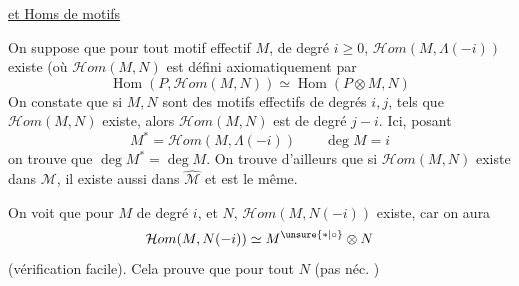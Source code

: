 \uline{ et Homs de motifs}

On suppose que pour tout motif effectif $M$, de degré $i\geq0$, $\mathcal Hom(M,\Lambda(-i))$ existe (où $\mathcal Hom(M,N)$ est défini axiomatiquement par
\[
\operatorname{Hom}(P,\mathcal Hom(M,N))\simeq\operatorname{Hom}(P\otimes M,N)
\]
On constate que si $M,N$ sont des motifs effectifs de degrés $i,j$, tels que $\mathcal Hom(M,N)$ existe, alors $\mathcal Hom(M,N)$ est de degré $j-i$. Ici, posant
\[
M^{*}=\mathcal Hom(M,\Lambda(-i))\qquad\deg M=i
\]
on trouve que $\deg M^{*}=\deg M$. On trouve d'ailleurs que si $\mathcal Hom(M,N)$ existe dans $\mathcal M$, il existe aussi dans $\widehat{\mathcal M}$ et est le même.

On voit que pour  $M$ de degré $i$, et  $N$, $\mathcal Hom(M,N(-i))$ existe, car on aura
\[
\mathcal Hom(M,N(-i))\simeq M^{\unsure{*|\circ}}\otimes N
\]
(vérification facile).  Cela prouve que pour tout $N$ (pas néc. )
